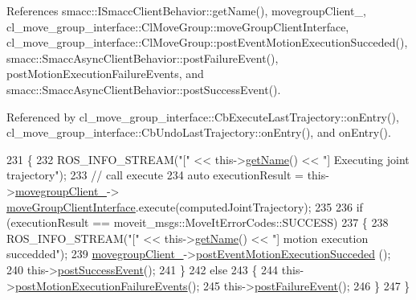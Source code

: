References smacc\+::\+I\+Smacc\+Client\+Behavior\+::get\+Name(), movegroup\+Client\+\_\+, cl\+\_\+move\+\_\+group\+\_\+interface\+::\+Cl\+Move\+Group\+::move\+Group\+Client\+Interface, cl\+\_\+move\+\_\+group\+\_\+interface\+::\+Cl\+Move\+Group\+::post\+Event\+Motion\+Execution\+Succeded(), smacc\+::\+Smacc\+Async\+Client\+Behavior\+::post\+Failure\+Event(), post\+Motion\+Execution\+Failure\+Events, and smacc\+::\+Smacc\+Async\+Client\+Behavior\+::post\+Success\+Event().



Referenced by cl\+\_\+move\+\_\+group\+\_\+interface\+::\+Cb\+Execute\+Last\+Trajectory\+::on\+Entry(), cl\+\_\+move\+\_\+group\+\_\+interface\+::\+Cb\+Undo\+Last\+Trajectory\+::on\+Entry(), and on\+Entry().


\begin{DoxyCode}
231     \{
232         ROS\_INFO\_STREAM(\textcolor{stringliteral}{"["} << this->\hyperlink{classsmacc_1_1ISmaccClientBehavior_a18e4bec9460b010f2894c0f7e7064a34}{getName}() << \textcolor{stringliteral}{"] Executing joint trajectory"});
233         \textcolor{comment}{// call execute}
234         \textcolor{keyword}{auto} executionResult = this->\hyperlink{classcl__move__group__interface_1_1CbMoveEndEffectorTrajectory_aea650d3e7836125b32be97392b71a7f3}{movegroupClient\_}->
      \hyperlink{classcl__move__group__interface_1_1ClMoveGroup_a92922ea689e4e1b7b91512c56629c95b}{moveGroupClientInterface}.execute(computedJointTrajectory);
235 
236         \textcolor{keywordflow}{if} (executionResult == moveit\_msgs::MoveItErrorCodes::SUCCESS)
237         \{
238             ROS\_INFO\_STREAM(\textcolor{stringliteral}{"["} << this->\hyperlink{classsmacc_1_1ISmaccClientBehavior_a18e4bec9460b010f2894c0f7e7064a34}{getName}() << \textcolor{stringliteral}{"] motion execution succedded"});
239             \hyperlink{classcl__move__group__interface_1_1CbMoveEndEffectorTrajectory_aea650d3e7836125b32be97392b71a7f3}{movegroupClient\_}->\hyperlink{classcl__move__group__interface_1_1ClMoveGroup_aebaf269db373d41837bae87651458e54}{postEventMotionExecutionSucceded}
      ();
240             this->\hyperlink{classsmacc_1_1SmaccAsyncClientBehavior_adf18efe1f0e4eacc1277b8865a8a94b1}{postSuccessEvent}();
241         \}
242         \textcolor{keywordflow}{else}
243         \{
244             this->\hyperlink{classcl__move__group__interface_1_1CbMoveEndEffectorTrajectory_a72c4a469b70617dc5ea75e225a013582}{postMotionExecutionFailureEvents}();
245             this->\hyperlink{classsmacc_1_1SmaccAsyncClientBehavior_af6fa358cb1ab5ed16791a201f59260e0}{postFailureEvent}();
246         \}
247     \}
\end{DoxyCode}
